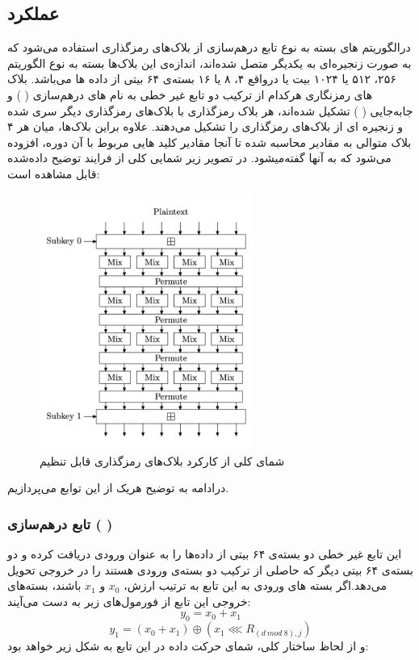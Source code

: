 \subsection{
	عملکرد
}
در‌الگوریتم های 
 بسته به نوع تابع درهم‌سازی از بلاک‌های رمزگذاری استفاده می‌شود که به صورت زنجیره‌ای به یکدیگر متصل شده‌اند، اندازه‌ی این بلاک‌ها بسته به نوع الگوریتم 
 ۲۵۶، ۵۱۲ یا ۱۰۲۴ بیت یا درواقع ۴، ۸ یا ۱۶ بسته‌ی ۶۴ بیتی از داده ها ‌می‌باشد. بلاک های رمزنگاری هرکدام از ترکیب دو تابع غیر خطی به نام های درهم‌سازی
 (
\textit{ }
 )
 و جابه‌جایی (
 \textit{ }
)
تشکیل شده‌اند، هر بلاک رمزگذاری با بلاک‌های رمزگذاری دیگر سری شده و زنجیره ای از بلاک‌های رمزگذاری را تشکیل می‌دهند. علاوه براین بلاک‌ها، میان هر ۴ بلاک متوالی به مقادیر محاسبه شده تا آنجا مقادیر کلید هایی مربوط با آن دوره، افزوده می‌شود که به آنها 
\textit{}
گفته‌میشود. در تصویر زیر شمایی کلی از فرایند توضیح داده‌شده قابل مشاهده است:
\begin{figure}[H]
	\centering
	\includegraphics[width=7cm]{Images/Introduction/cipherblock_dataflow.png}	
	\caption{
		شمای کلی از کارکرد بلاک‌های رمزگذاری قابل تنظیم 
	}
\end{figure}
درادامه به توضیح هر‌یک از این توابع می‌پردازیم.
\pagebreak

\subsubsection{
تابع درهم‌سازی (
)
}
این تابع غیر خطی دو بسته‌ی ۶۴ بیتی از داده‌ها ‌را به عنوان ورودی دریافت کرده و دو بسته‌ی ۶۴ بیتی دیگر که حاصلی از ترکیب دو بسته‌ی ورودی هستند را در خروجی تحویل می‌دهد.اگر بسته های ورودی به این تابع به ترتیب ارزش، 
$x_0$ 
و
$x_1$
باشند، بسته‌های خروجی این تابع از فورمول‌های زیر به دست می‌‌آیند:
$$y_0 = x_0 + x_1$$
$$y_1 = (x_0 + x_1) \oplus ( x_1 \lll R_{(d\ mod\  8),j})$$
و از لحاظ ساختار کلی، شمای حرکت داده در این تابع به شکل زیر خواهد بود:


